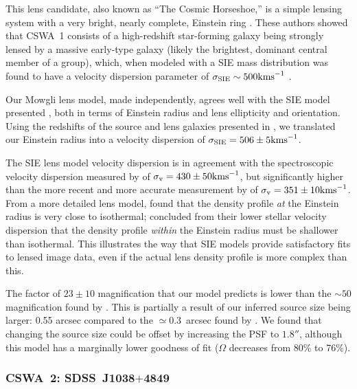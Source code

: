 \documentclass[iop]{emulateapj}
\def\kms{{\rm km s}^{-1}}
\def\sigmaSIE{\sigma_{\rm SIE}}
\def\theapplet{{\sc Mowgli}\xspace}
\begin{document}
This lens candidate, also known as ``The Cosmic Horseshoe,''  is a simple
lensing system with a very bright, nearly complete, Einstein ring
\citep{Bel++07}. These authors showed that CSWA~1 consists of a high-redshift
star-forming galaxy being strongly lensed by a massive early-type galaxy (likely
the brightest, dominant central member of a group),  which, when modeled with a
SIE mass distribution was found to have a velocity dispersion parameter of 
$\sigmaSIE \sim 500 \kms$ \citep{Dye++08}. 

Our \theapplet lens model, made independently,  agrees well with the SIE model
presented \citep{Dye++08}, both in terms of Einstein radius and lens ellipticity
and orientation.  Using the redshifts of the source and lens galaxies presented
in \citet{Bel++07}, we translated our Einstein radius into a velocity dispersion
of $\sigmaSIE = 506 \pm 5 \kms$.

The SIE lens model velocity dispersion  is in agreement with the spectroscopic
velocity dispersion measured by \citet{Bel++07} of  $\sigma_{\rm v} = 430 \pm 50
\kms$, but significantly higher than the more recent and more accurate 
measurement by \citet{Spi++11} of $\sigma_{\rm v} = 351 \pm 10 \kms$. From a
more detailed lens model, \citet{Dye++08} found that the density profile {\it
at} the Einstein radius  is very close to isothermal; \citet{Spi++11} concluded
from  their lower stellar velocity dispersion that the density profile {\it
within} the Einstein radius must be shallower than isothermal. This illustrates
the way that SIE models provide satisfactory fits to  lensed image data, even if
the actual lens density profile is more complex than this.

The factor of $23 \pm 10$ magnification that our model predicts is lower than
the $\sim 50$ magnification found by \citep{Bel++07}. This is partially a result
of our inferred source size being larger: 0.55 arcsec compared to the $\simeq
0.3$~arcsec found by \citet{Dye++08}. We found that changing the source size
could be offset by increasing the PSF to $1.8''$, although this model has a
marginally lower goodness of fit ($\Omega$ decreases from 80\% to  76\%).


\subsubsection*{CSWA~2: SDSS\ J1038$+$4849}
\label{sec:results:indinotes:cswa2}
\end{document}
